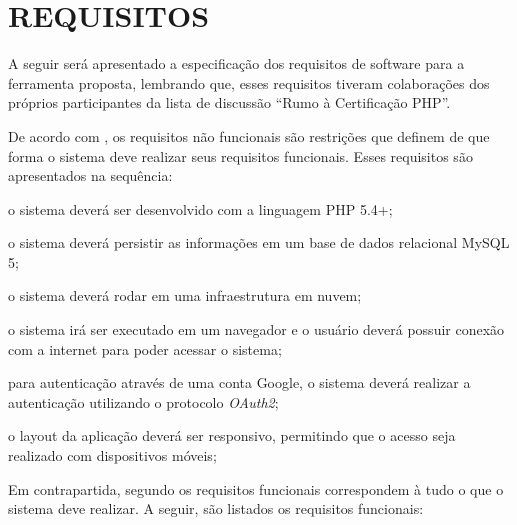 \section{REQUISITOS}

A seguir será apresentado a especificação dos requisitos de software para a
ferramenta proposta, lembrando que, esses requisitos tiveram colaborações dos
próprios participantes da lista de discussão ``Rumo à Certificação PHP''.

De acordo com
, os
requisitos não funcionais são restrições que definem de que forma o sistema 
deve realizar seus requisitos funcionais. Esses requisitos são apresentados  na
sequência:

\begin{alineas}
	\item o sistema deverá ser desenvolvido com a linguagem PHP 5.4+;
	\item o sistema deverá persistir as informações em um base de dados relacional
	MySQL 5;
	\item o sistema deverá rodar em uma infraestrutura em nuvem;
	\item o sistema irá ser executado em um navegador e o usuário deverá possuir
	conexão com a internet para poder acessar o sistema;
	\item para autenticação através de uma conta Google, o sistema deverá realizar
	a autenticação utilizando o protocolo \textit{OAuth2};
	\item o layout da aplicação deverá ser responsivo, permitindo que o acesso
    seja realizado com dispositivos móveis;
\end{alineas}

Em contrapartida, segundo
 os
requisitos  funcionais correspondem à tudo o que o sistema deve realizar. A
seguir, são listados os requisitos funcionais:


